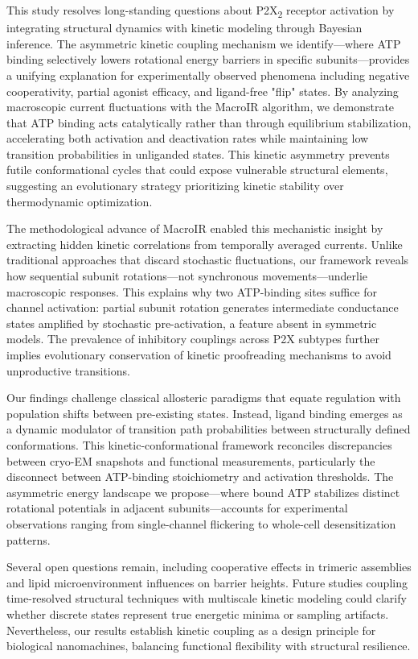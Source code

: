 \documentclass[pdflatex,sn-mathphys-num]{sn-jnl}%
\theoremstyle{thmstyleone}%
\theoremstyle{thmstyletwo}%
\theoremstyle{thmstylethree}%
\begin{document}
This study resolves long-standing questions about P2X\textsubscript{2} receptor activation by integrating structural dynamics with kinetic modeling through Bayesian inference. The asymmetric kinetic coupling mechanism we identify—where ATP binding selectively lowers rotational energy barriers in specific subunits—provides a unifying explanation for experimentally observed phenomena including negative cooperativity, partial agonist efficacy, and ligand-free "flip" states. By analyzing macroscopic current fluctuations with the MacroIR algorithm, we demonstrate that ATP binding acts catalytically rather than through equilibrium stabilization, accelerating both activation and deactivation rates while maintaining low transition probabilities in unliganded states. This kinetic asymmetry prevents futile conformational cycles that could expose vulnerable structural elements, suggesting an evolutionary strategy prioritizing kinetic stability over thermodynamic optimization.

The methodological advance of MacroIR enabled this mechanistic insight by extracting hidden kinetic correlations from temporally averaged currents. Unlike traditional approaches that discard stochastic fluctuations, our framework reveals how sequential subunit rotations—not synchronous movements—underlie macroscopic responses. This explains why two ATP-binding sites suffice for channel activation: partial subunit rotation generates intermediate conductance states amplified by stochastic pre-activation, a feature absent in symmetric models. The prevalence of inhibitory couplings across P2X subtypes further implies evolutionary conservation of kinetic proofreading mechanisms to avoid unproductive transitions.

Our findings challenge classical allosteric paradigms that equate regulation with population shifts between pre-existing states. Instead, ligand binding emerges as a dynamic modulator of transition path probabilities between structurally defined conformations. This kinetic-conformational framework reconciles discrepancies between cryo-EM snapshots and functional measurements, particularly the disconnect between ATP-binding stoichiometry and activation thresholds. The asymmetric energy landscape we propose—where bound ATP stabilizes distinct rotational potentials in adjacent subunits—accounts for experimental observations ranging from single-channel flickering to whole-cell desensitization patterns.

Several open questions remain, including cooperative effects in trimeric assemblies and lipid microenvironment influences on barrier heights. Future studies coupling time-resolved structural techniques with multiscale kinetic modeling could clarify whether discrete states represent true energetic minima or sampling artifacts. Nevertheless, our results establish kinetic coupling as a design principle for biological nanomachines, balancing functional flexibility with structural resilience.
\end{document}
